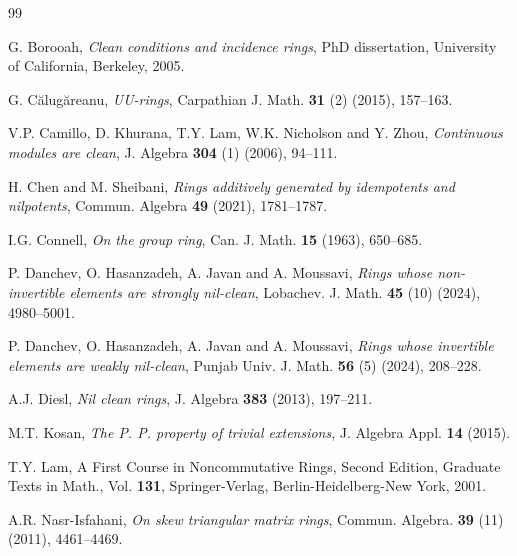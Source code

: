 \documentclass[12pt]{amsart}
\theoremstyle{definition}
\begin{document}


\vskip3.0pc

\begin{thebibliography}{99}
	
G. Borooah, {\it Clean conditions and incidence rings}, PhD dissertation, University of California, Berkeley, 2005.	

G. C{\u{a}}lug{\u{a}}reanu, {\it UU-rings}, Carpathian J. Math. {\bf 31} (2) (2015), 157--163.		

V.P. Camillo, D. Khurana, T.Y. Lam, W.K. Nicholson and Y. Zhou, {\it Continuous modules are clean}, J. Algebra {\bf 304} (1) (2006), 94--111.

H. Chen and M. Sheibani, {\it Rings additively generated by idempotents and nilpotents}, Commun. Algebra {\bf 49} (2021), 1781--1787.

I.G. Connell, {\it On the group ring}, Can. J. Math. {\bf 15} (1963), 650--685.

P. Danchev, O. Hasanzadeh, A. Javan and A. Moussavi, {\it Rings whose non-invertible elements are strongly nil-clean}, Lobachev. J. Math. {\bf 45} (10) (2024), 4980--5001.

P. Danchev, O. Hasanzadeh, A. Javan and A. Moussavi, {\it Rings whose invertible elements are weakly nil-clean}, Punjab Univ. J. Math. {\bf 56} (5) (2024), 208--228.

A.J. Diesl, {\it Nil clean rings}, J. Algebra {\bf 383} (2013), 197--211.

M.T. Kosan, {\it The P. P. property of trivial extensions}, J. Algebra Appl. {\bf 14} (2015).

T.Y. Lam, A First Course in Noncommutative Rings, Second Edition, Graduate Texts in Math., Vol. {\bf 131}, Springer-Verlag, Berlin-Heidelberg-New York, 2001.

A.R. Nasr-Isfahani, {\it On skew triangular matrix rings}, Commun. Algebra. {\bf 39} (11) (2011), 4461--4469.


\end{thebibliography}
\end{document}
